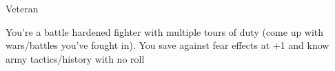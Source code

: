 \begin{mercHeading}
Veteran
\end{mercHeading}
You're a battle hardened fighter with multiple tours of duty (come up with wars/battles you've fought in). You save against fear effects at +1 and know army tactics/history with no roll